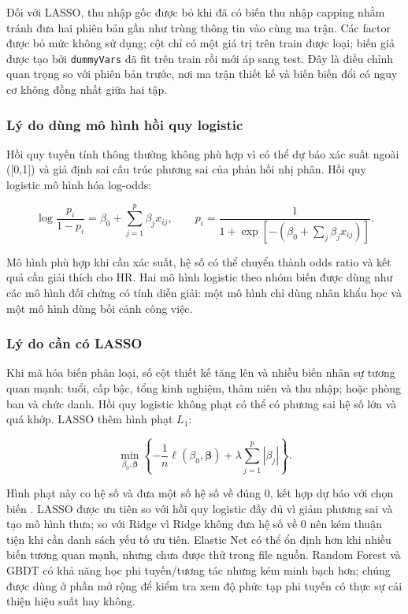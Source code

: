Đối với LASSO, thu nhập gốc được bỏ khi đã có biến thu nhập capping nhằm
tránh đưa hai phiên bản gần như trùng thông tin vào cùng ma trận. Các
factor được bỏ mức không sử dụng; cột chỉ có một giá trị trên train được
loại; biến giả được tạo bởi \texttt{dummyVars} đã fit trên train rồi mới
áp sang test. Đây là điều chỉnh quan trọng so với phiên bản trước, nơi
ma trận thiết kế và biến biến đổi có nguy cơ không đồng nhất giữa hai
tập.

\subsubsection{Lý do dùng mô hình hồi quy logistic}

Hồi quy tuyến tính thông thường không phù hợp vì có thể dự báo xác suất
ngoài ([0,1]) và giả định sai cấu trúc phương sai của phản hồi nhị
phân. Hồi quy logistic mô hình hóa log-odds:

\[
\log\frac{p_i}{1-p_i}=\beta_0+\sum_{j=1}^{p}\beta_jx_{ij},
\qquad
p_i=\frac{1}{1+\exp[-(\beta_0+\sum_j\beta_jx_{ij})]}.
\]

Mô hình phù hợp khi cần xác suất, hệ số có thể chuyển thành odds ratio
và kết quả cần giải thích cho HR. Hai mô hình logistic theo nhóm biến
được dùng như các mô hình đối chứng có tính diễn giải: một mô hình chỉ
dùng nhân khẩu học và một mô hình dùng bối cảnh công việc.

\subsubsection{Lý do cần có LASSO}

Khi mã hóa biến phân loại, số cột thiết kế tăng lên và nhiều biến nhân
sự tương quan mạnh: tuổi, cấp bậc, tổng kinh nghiệm, thâm niên và thu
nhập; hoặc phòng ban và chức danh. Hồi quy logistic không phạt có thể có
phương sai hệ số lớn và quá khớp. LASSO thêm hình phạt \(L_1\):

\[
\min_{\beta_0,\boldsymbol\beta}
\left\{-\frac{1}{n}\ell(\beta_0,\boldsymbol\beta)
+\lambda\sum_{j=1}^{p}|\beta_j|\right\}.
\]

Hình phạt này co hệ số và đưa một số hệ số về đúng 0, kết hợp dự báo với
chọn biến \cite{tibshirani1996,hastie2009}. LASSO được ưu tiên so với
hồi quy logistic đầy đủ vì giảm phương sai và tạo mô hình thưa; so với
Ridge vì Ridge không đưa hệ số về 0 nên kém thuận tiện khi cần danh sách
yếu tố ưu tiên. Elastic Net có thể ổn định hơn khi nhiều biến tương quan
mạnh, nhưng chưa được thử trong file nguồn. Random Forest và GBDT có
khả năng học phi tuyến/tương tác nhưng kém minh bạch hơn; chúng được dùng
ở phần mở rộng để kiểm tra xem độ phức tạp phi tuyến có thực sự cải thiện
hiệu suất hay không.

